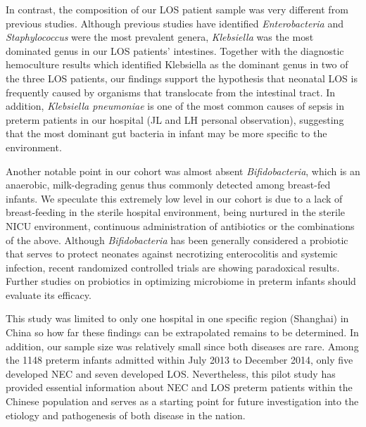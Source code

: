 \documentclass[fleqn,10pt, lineno]{wlpeerj} %
\begin{document}
In contrast, the composition of our LOS patient sample was very different from previous studies.  Although previous studies have identified \textit{Enterobacteria} and \textit{Staphylococcus} were the most prevalent genera\citep{Stewart2017Longitudinal, mai2013distortions}, \textit{Klebsiella} was the most dominated genus in our LOS patients’ intestines. Together with the diagnostic hemoculture results which identified Klebsiella as the dominant genus in two of the three LOS patients, our findings support the hypothesis that neonatal LOS is frequently caused by organisms that translocate from the intestinal tract. In addition, \textit{Klebsiella pneumoniae} is one of the most common causes of sepsis in preterm patients in our hospital (JL and LH personal observation), suggesting that the most dominant gut bacteria in infant may be more specific to the environment.

Another notable point in our cohort was almost absent \textit{Bifidobacteria}, which is an anaerobic, milk-degrading genus\citep{gomez2016human} thus commonly detected among breast-fed infants\citep{murphy2017composition}. We speculate this extremely low level in our cohort is due to a lack of breast-feeding in the sterile hospital environment, being nurtured in the sterile NICU environment, continuous administration of antibiotics or the combinations of the above. Although \textit{Bifidobacteria} has been generally considered a probiotic that serves to protect neonates against necrotizing enterocolitis and systemic infection\citep{nakayama2003intestinal, khodayar2014impact, hermansson2019breast}, recent randomized controlled trials are showing paradoxical results\citep{hays2016probiotics, singh2019probiotics}. Further studies on probiotics in optimizing microbiome in preterm infants should evaluate its efficacy.

This study was limited to only one hospital in one specific region (Shanghai)  in China so how far these findings can be extrapolated remains to be determined. In addition, our sample size was relatively small since both diseases are rare\citep{neu2011necrotizing, cohen2009early}. Among the 1148 preterm infants admitted within July 2013 to December 2014, only five developed NEC and seven developed LOS. Nevertheless, this pilot study has provided essential information about NEC and LOS preterm patients within the Chinese population and serves as a starting point for future investigation into the etiology and pathogenesis of both disease in the nation.


\end{document}
